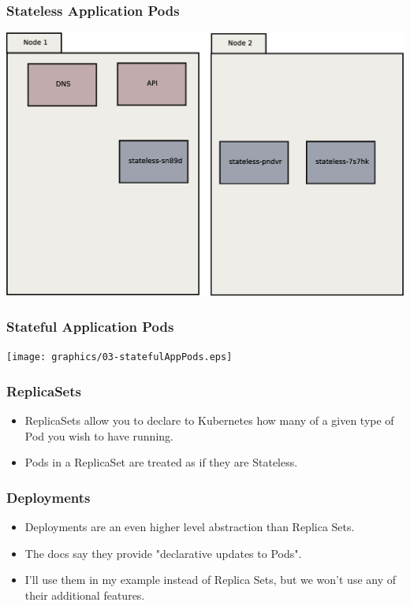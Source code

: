 \documentclass{beamer}
\begin{document}
\begin{frame}
    \frametitle{Stateless Application Pods}
    \includegraphics[width=\textwidth,height=\textheight,keepaspectratio]{graphics/02-statelessAppPods.eps}
\end{frame}

\begin{frame}
    \frametitle{Stateful Application Pods}
    \texttt{[image: graphics/03-statefulAppPods.eps]}
\end{frame}

\begin{frame}
\frametitle{ReplicaSets}
\begin{itemize}    
    \item ReplicaSets allow you to declare to Kubernetes how many of a given type of Pod you wish to have running.
    \item Pods in a ReplicaSet are treated as if they are Stateless.
\end{itemize}
\end{frame}

\begin{frame}
    \frametitle{Deployments}
    \begin{itemize}
        \item Deployments are an even higher level abstraction than Replica Sets.
        \item The docs say they provide "declarative updates to Pods".
        \item I'll use them in my example instead of Replica Sets, but we won't use any of their additional features.
    \end{itemize}
\end{frame}
\end{document}
